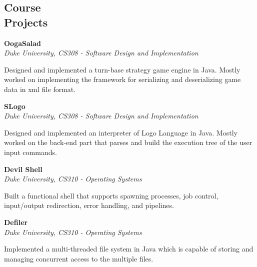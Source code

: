 \documentclass[11pt,margin,line]{cv}
\begin{document}
\begin{resume}
    \section{\mysidestyle Course\\Projects}
    \textbf{\textbf{OogaSalad}}\\
    \textsl{Duke University, CS308 - Software Design and Implementation}
    \begin{list3}
        \item Designed and implemented a turn-base strategy game engine in Java. Mostly worked on implementing the framework for serializing and deserializing game data in xml file format.
    \end{list3}
    \textbf{\textbf{SLogo}}\\
    \textsl{Duke University, CS308 - Software Design and Implementation}
    \begin{list3}
        \item Designed and implemented an interpreter of Logo Language in Java. Mostly worked on the back-end part that parses and build the execution tree of the user input commands.
    \end{list3}
    \textbf{\textbf{Devil Shell}}\\
    \textsl{Duke University, CS310 - Operating Systems}
    \begin{list3}
        \item Built a functional shell that supports spawning processes, job control, input/output redirection, error handling, and pipelines.
    \end{list3}
    \textbf{\textbf{Defiler}}\\
    \textsl{Duke University, CS310 - Operating Systems}
    \begin{list3}
        \item Implemented a multi-threaded file system in Java which is capable of storing and managing concurrent access to the multiple files.
    \end{list3}

\end{resume}
\end{document}
